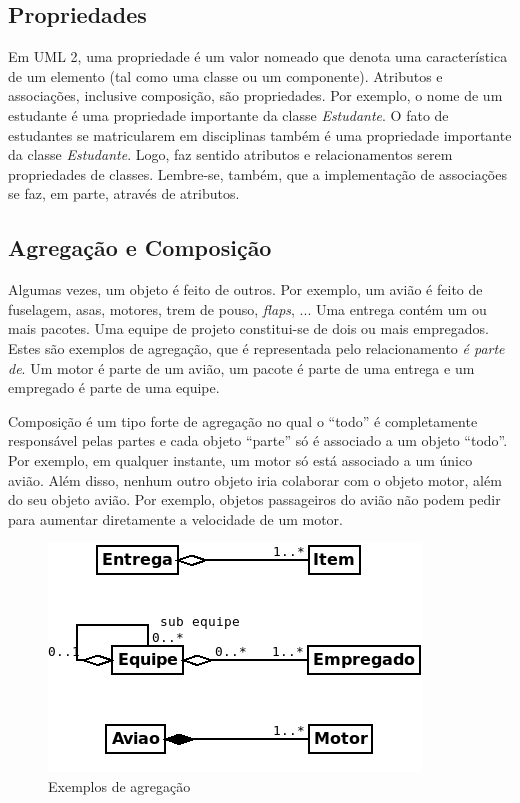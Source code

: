 \subsection{Propriedades}

Em UML 2, uma propriedade é um valor nomeado que denota uma característica de um elemento (tal como uma classe ou um componente). Atributos e associações, inclusive composição, são propriedades. Por exemplo, o nome de um estudante é uma propriedade importante da classe \emph{Estudante}. O fato de estudantes se matricularem em disciplinas também é uma propriedade importante da classe \emph{Estudante}. Logo, faz sentido atributos e relacionamentos serem propriedades de classes. Lembre-se, também, que a implementação de associações se faz, em parte, através de atributos.

\subsection{Agregação e Composição}

Algumas vezes, um objeto é feito de outros. Por exemplo, um avião é feito de fuselagem, asas, motores, trem de pouso, \textit{flaps}, ... Uma entrega contém um ou mais pacotes. Uma equipe de projeto constitui-se de dois ou mais empregados. Estes são exemplos de agregação, que é representada pelo relacionamento \emph{é parte de}. Um motor é parte de um avião, um pacote é parte de uma entrega e um empregado é parte de uma equipe.

Composição é um tipo forte de agregação no qual o ``todo'' é completamente responsável pelas partes e cada objeto ``parte'' só é associado a um objeto ``todo''. Por exemplo, em qualquer instante, um motor só está associado a um único avião. Além disso, nenhum outro objeto iria colaborar com o objeto motor, além do seu objeto avião. Por exemplo, objetos passageiros do avião não podem pedir para aumentar diretamente a velocidade de um motor.

\begin{figure}[h]
\begin{center}
\includegraphics[scale=0.6]{agreg.png} 
\caption{Exemplos de agregação} \label{fig:uml8}
\end{center}\end{figure}


